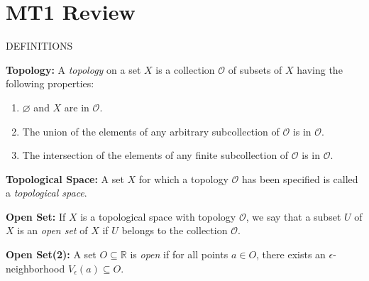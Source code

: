 \documentclass[12pt, a4paper]{article}
\begin{document}
\section{MT1 Review}

\hline

\vspace{2mm}

\centerline{DEFINITIONS}

\vspace{2mm}

\hline

\vspace{4mm}\par 

 \hspace{4mm}\textbf{Topology:} A \textit{topology} on a set $X$ is a collection $\mathcal{O}$ of subsets of $X$ having the following properties:

\begin{enumerate}[label=(\arabic*)]
    \item $\varnothing$ and $X$ are in $\mathcal{O}$.
    \item The union of the elements of any arbitrary subcollection of $\mathcal{O}$ is in $\mathcal{O}$.
    \item The intersection of the elements of any finite subcollection of $\mathcal{O}$ is in $\mathcal{O}$.
\end{enumerate}

\vspace{4mm}\par

\textbf{Topological Space:} A set $X$ for which a topology $\mathcal{O}$ has been specified is called a \textit{topological space}.

\vspace{4mm}\par

\textbf{Open Set:} If $X$ is a topological space with topology $\mathcal{O}$, we say that a subset $U$ of $X$ is an \textit{open set} of $X$ if $U$ belongs to the collection $\mathcal{O}$.

\vspace{4mm}\par

\textbf{Open Set(2):} A set $O\subseteq\mathbb{R}$ is \textit{open} if for all points $a\in O$, there exists an $\epsilon$-neighborhood $V_{\epsilon}(a)\subseteq O$.

\vspace{4mm}\par
\end{document}
